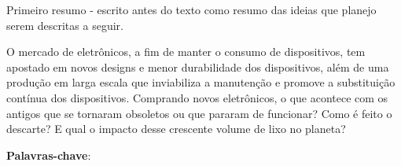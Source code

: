 \documentclass[
	article,			%
	11pt,				%
	oneside,			%
	a4paper,			%
	english,			%
	brazil,				%
	sumario=tradicional
	]{abntex2}
\begin{document}

\frenchspacing 



%
%



\maketitle





\begin{resumoumacoluna}


Primeiro resumo - escrito antes do texto como resumo das ideias que planejo serem descritas a seguir. 

O mercado de eletrônicos, a fim de manter o consumo de dispositivos, tem apostado em novos designs e menor durabilidade dos dispositivos, além de uma produção em larga escala que inviabiliza a manutenção e promove a substituição contínua dos dispositivos. 
Comprando novos eletrônicos, o que acontece com os antigos que se tornaram obsoletos ou que pararam de funcionar? Como é feito o descarte? E qual o impacto desse crescente volume de lixo no planeta?


 \vspace{\onelineskip}
 
 \noindent
 \textbf{Palavras-chave}: 
\end{resumoumacoluna}
\end{document}
